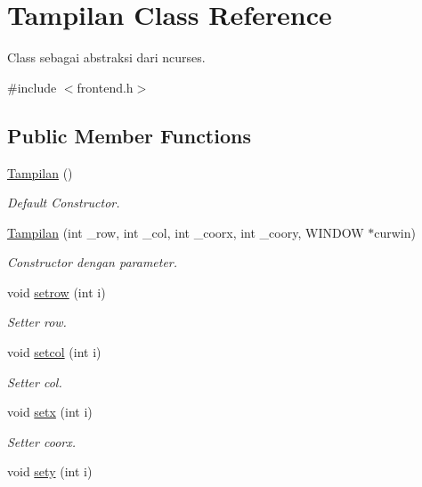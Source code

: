 \hypertarget{classTampilan}{}\section{Tampilan Class Reference}
\label{classTampilan}


Class sebagai abstraksi dari ncurses.  




{\ttfamily \#include $<$frontend.\+h$>$}

\subsection*{Public Member Functions}
\begin{DoxyCompactItemize}
\item 
\mbox{\hyperlink{classTampilan_a43f269e3d5c293042af6037f5fdaef05}{Tampilan}} ()
\begin{DoxyCompactList}\small\item\em Default Constructor. \end{DoxyCompactList}\item 
\mbox{\hyperlink{classTampilan_a287f24563e5ce3776908f4b489a337f3}{Tampilan}} (int \+\_\+row, int \+\_\+col, int \+\_\+coorx, int \+\_\+coory, W\+I\+N\+D\+OW $\ast$curwin)
\begin{DoxyCompactList}\small\item\em Constructor dengan parameter. \end{DoxyCompactList}\item 
void \mbox{\hyperlink{classTampilan_aaec0545eaf5a7646482158078d0e6cd3}{setrow}} (int i)
\begin{DoxyCompactList}\small\item\em Setter row. \end{DoxyCompactList}\item 
void \mbox{\hyperlink{classTampilan_ac617ef582e2fe3a894c71372f60e562f}{setcol}} (int i)
\begin{DoxyCompactList}\small\item\em Setter col. \end{DoxyCompactList}\item 
void \mbox{\hyperlink{classTampilan_a1c8443c5bde9718f078ea517bf9f27f0}{setx}} (int i)
\begin{DoxyCompactList}\small\item\em Setter coorx. \end{DoxyCompactList}\item 
void \mbox{\hyperlink{classTampilan_a697d4d73cd649452b0c1aa8ef17c38f9}{sety}} (int i)

\end{DoxyCompactItemize}
